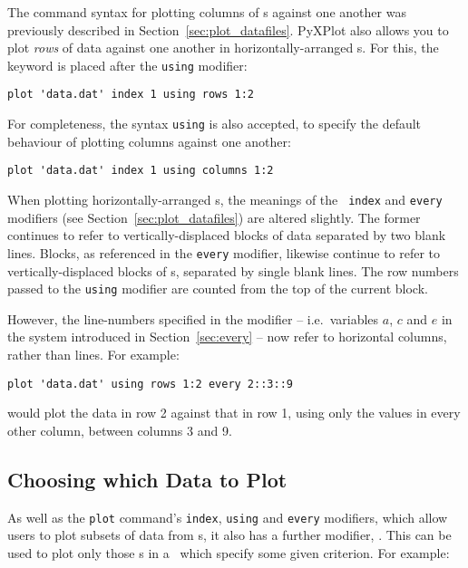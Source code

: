 \label{sec:horizontal_datafiles} The command syntax for plotting
columns of \datafile s against one another was previously described in
Section~\ref{sec:plot_datafiles}. PyXPlot also allows you to plot {\it rows} of
data against one another in horizontally-arranged \datafile s.  For this, the
keyword  is placed after the {\tt using} modifier:

\begin{verbatim}
plot 'data.dat' index 1 using rows 1:2
\end{verbatim}

\noindent For completeness, the syntax {\tt using}  is also
accepted, to specify the default behaviour of plotting columns against one
another:

\begin{verbatim}
plot 'data.dat' index 1 using columns 1:2
\end{verbatim}

When plotting horizontally-arranged \datafile s, the meanings of the {\tt
index} and {\tt every} modifiers (see Section~\ref{sec:plot_datafiles}) are
altered slightly. The former continues to refer to vertically-displaced blocks
of data separated by two blank lines.  Blocks, as referenced in the {\tt every}
modifier, likewise continue to refer to vertically-displaced blocks of
\datapoint s, separated by single blank lines. The row numbers passed to the
{\tt using} modifier are counted from the top of the current block.

However, the line-numbers specified in the  modifier -- i.e.\
variables $a$, $c$ and $e$ in the system introduced in Section~\ref{sec:every}
-- now refer to horizontal columns, rather than lines. For example:

\begin{verbatim}
plot 'data.dat' using rows 1:2 every 2::3::9
\end{verbatim}

\noindent would plot the data in row 2 against that in row 1, using only the
values in every other column, between columns 3 and 9.

\subsection{Choosing which Data to Plot}
\label{sec:select_modifier}
As well as the {\tt plot} command's {\tt index}, {\tt using} and {\tt every}
modifiers, which allow users to plot subsets of data from \datafile s, it also
has a further modifier, \indmodt{select}. This can be used to plot only those
\datapoint s in a \datafile\ which specify some given criterion. For example:


